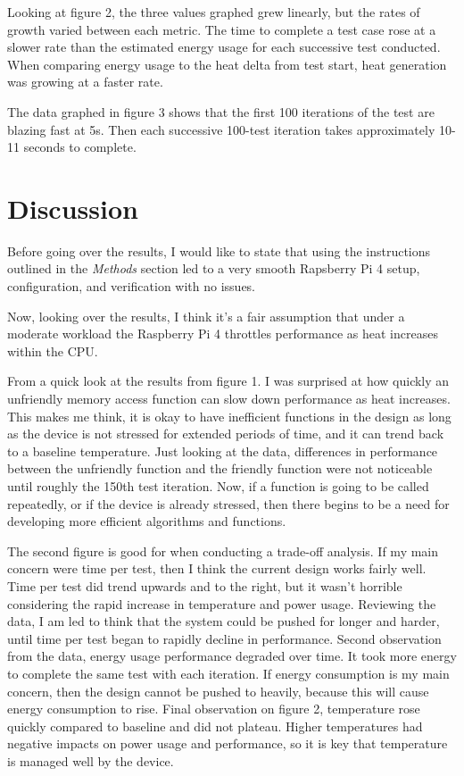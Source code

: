 \documentclass[journal]{IEEEtran}
\begin{document}
    Looking at figure 2, the three values graphed grew linearly, but the rates of growth varied between each metric. 
    The time to complete a test case rose at a slower rate than the estimated energy usage for each successive test conducted. 
    When comparing energy usage to the heat delta from test start, heat generation was growing at a faster rate. 

    The data graphed in figure 3 shows that the first 100 iterations of the test are blazing fast at 5s. 
    Then each successive 100-test iteration takes approximately 10-11 seconds to complete.


    \section{Discussion}
    Before going over the results, I would like to state that using the instructions outlined in the \emph{Methods} section led to a very smooth Rapsberry Pi 4 setup, configuration, and verification with no issues.

    Now, looking over the results, I think it's a fair assumption that under a moderate workload the Raspberry Pi 4 throttles performance as heat increases within the CPU.

    From a quick look at the results from figure 1. I was surprised at how quickly an unfriendly memory access function can slow down performance as heat increases. 
    This makes me think, it is okay to have inefficient functions in the design as long as the device is not stressed for extended periods of time, and it can trend back to a baseline temperature.
    Just looking at the data, differences in performance between the unfriendly function and the friendly function were not noticeable until roughly the 150th test iteration.
    Now, if a function is going to be called repeatedly, or if the device is already stressed, then there begins to be a need for developing more efficient algorithms and functions.

    The second figure is good for when conducting a trade-off analysis. If my main concern were time per test, then I think the current design works fairly well. 
    Time per test did trend upwards and to the right, but it wasn't horrible considering the rapid increase in temperature and power usage.
    Reviewing the data, I am led to think that the system could be pushed for longer and harder, until time per test began to rapidly decline in performance.
    Second observation from the data, energy usage performance degraded over time. It took more energy to complete the same test with each iteration.
    If energy consumption is my main concern, then the design cannot be pushed to heavily, because this will cause energy consumption to rise.
    Final observation on figure 2, temperature rose quickly compared to baseline and did not plateau. 
    Higher temperatures had negative impacts on power usage and performance, so it is key that temperature is managed well by the device.
\end{document}
